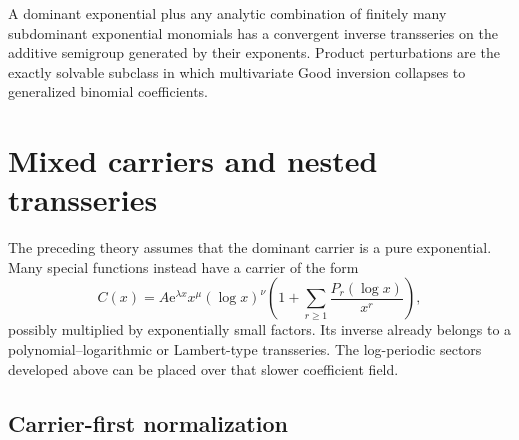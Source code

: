 \documentclass[11pt,oneside]{article}
\numberwithin{equation}{section}
\theoremstyle{plain}
\theoremstyle{definition}
\theoremstyle{remark}
\newcommand{\e}{\mathrm e}
\begin{document}
\begin{summarybox}
A dominant exponential plus any analytic combination of finitely many
subdominant exponential monomials has a convergent inverse transseries on
the additive semigroup generated by their exponents.  Product perturbations
are the exactly solvable subclass in which multivariate Good inversion
collapses to generalized binomial coefficients.
\end{summarybox}
\section{Mixed carriers and nested transseries}\label{sec:mixed-carriers}

The preceding theory assumes that the dominant carrier is a pure
exponential.  Many special functions instead have a carrier of the form
\begin{equation}\label{eq:mixed-carrier}
 C(x)=A\e^{\lambda x}x^\mu(\log x)^\nu
 \left(1+\sum_{r\ge1}\frac{P_r(\log x)}{x^r}\right),
\end{equation}
possibly multiplied by exponentially small factors.  Its inverse already
belongs to a polynomial--logarithmic or Lambert-type transseries.  The
log-periodic sectors developed above can be placed over that slower
coefficient field.

\subsection{Carrier-first normalization}
\end{document}
